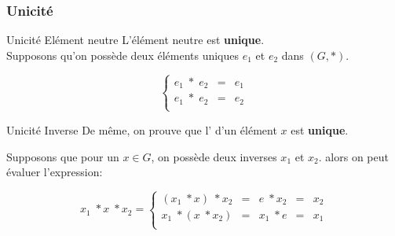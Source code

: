 \documentclass{beamer}
\begin{document}
\begin{frame}[<+->]
  \frametitle{Unicité}
 \begin{block}{Unicité Elément neutre}
   L'élément neutre est \textbf{\alert{unique}}.\\[8pt]
   \scriptsize
   Supposons qu'on possède deux éléments uniques $e_1$ et $e_2$ dans $(G, *)$.

   \begin{equation}
     \left\{\begin{array}{lll}
         e_1\;*\; e_2 &=& e_1\\[4pt]
         e_1\;*\; e_2 &=& e_2\\
       \end{array}
     \right.
   \end{equation}
 \end{block} 

 \begin{block}{Unicité Inverse}
   De même, on prouve que l'\textbf{} d'un élément $x$ est
   \textbf{\alert{unique}}.
   \scriptsize

   Supposons que pour un $x\in G$, on possède deux inverses $x_1$ et $x_2$.
   alors on peut évaluer l'expression:

   \begin{equation}
     x_1\;*x\;*x_2 = \left\{ \begin{array}{lllll}
         \left(x_1\;*x\right)\;* x_2 & = & e \;* x_2 & =& x_2\\[4pt]
         x_1\;*\left(x\;* x_2\right) & = & x_1 \;* e & =& x_1\\
       \end{array}
     \right.
   \end{equation}
 \end{block}
\end{frame}
\end{document}

